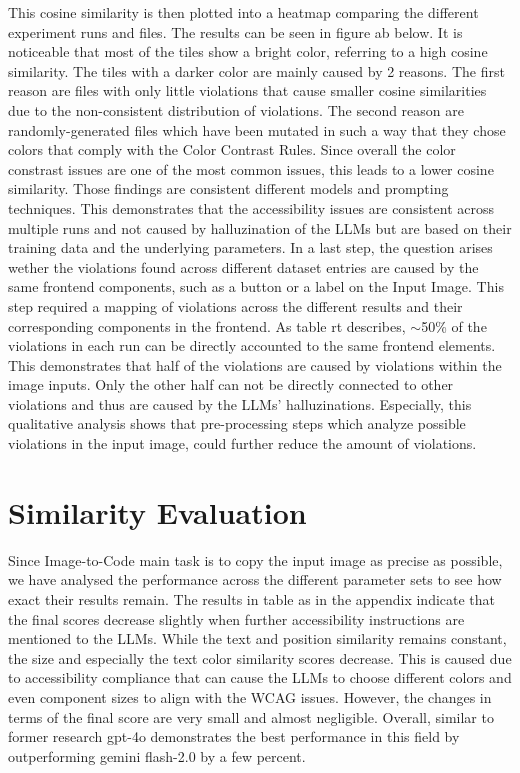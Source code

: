 This cosine similarity is then plotted into a heatmap comparing the different 
experiment runs and files. The results can be seen in figure ab below. It 
is noticeable that most of the tiles show a bright color, referring to a 
high cosine similarity. The tiles with a darker color are mainly caused 
by 2 reasons. The first reason are files with only little violations 
that cause smaller cosine similarities due to the non-consistent 
distribution of violations. The second reason are randomly-generated 
files which have been mutated in such a way that they chose colors that 
comply with the Color Contrast Rules. Since overall the color constrast 
issues are one of the most common issues, this leads to a lower cosine 
similarity.\newline
Those findings are consistent different models and 
prompting techniques. This demonstrates that the accessibility issues are 
consistent across multiple runs and not caused by halluzination of the 
LLMs but are based on their training data and the underlying parameters.\newline
In a last step, the question arises wether the violations found across
different dataset entries are caused by the same frontend components, such 
as a button or a label on the Input Image. This step required a mapping
of violations across the different results and their corresponding
components in the frontend. As table rt describes, $\sim$50\% of the 
violations in each run can be directly accounted to the same frontend 
elements. This demonstrates that half of the violations are caused by 
violations within the image inputs. Only the other half can not be directly 
connected to other violations and thus are caused by the LLMs' halluzinations.\newline
Especially, this qualitative analysis shows that pre-processing steps which 
analyze possible violations in the input image, could further reduce the 
amount of violations.


\section{Similarity Evaluation}
Since Image-to-Code main task is to copy the input image as precise as possible,
we have analysed the performance across the different parameter sets to see how 
exact their results remain. The results in table as in the appendix 
indicate that the final scores decrease slightly when further accessibility 
instructions are mentioned to the LLMs. While the text and position similarity 
remains constant, the size and especially the text color similarity scores 
decrease. This is caused due to accessibility compliance that can cause the
LLMs to choose different colors and even component sizes to align with the 
WCAG issues. However, the changes in terms of the final score are very small 
and almost negligible.\newline
Overall, similar to former research gpt-4o demonstrates the best performance 
in this field by outperforming gemini flash-2.0 by a few percent.
